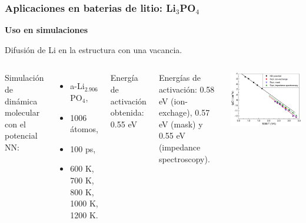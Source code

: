 \documentclass[aspectratio=169]{beamer}
\let\oldtextbf\textbf
\renewcommand{\textbf}[1]{\textcolor{nordblue}{\oldtextbf{#1}}}
\begin{document}
    \begin{frame}
        \frametitle{Aplicaciones en baterias de litio: Li$_3$PO$_4$}
            
        \textbf{Uso en simulaciones}

        Difusión de Li en la estructura con una vacancia.
        
        \begin{columns}
            Simulación de dinámica molecular con el potencial NN:
            \begin{itemize}
                \item a-Li$_{2.906}$PO$_4$,
                \item 1006 átomos,
                \item 100 ps,
                \item 600 K, 700 K, 800 K, 1000 K, 1200 K.
            \end{itemize}

            Energía de activación obtenida: 0.55 eV

            Energías de activación: 0.58 eV (ion-exchage), 0.57 eV (mask) y
            0.55 eV (impedance spectroscopy).
            \begin{center}
                \includegraphics[width=\columnwidth]{Li3PO4-MD-arrhenius.png}
            \end{center}
        \end{columns}

    \end{frame}
\end{document}

